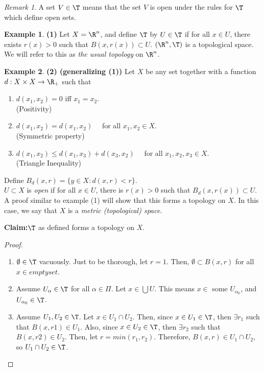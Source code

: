 \documentclass[a5paper]{article}
\theoremstyle{definition}%
\newtheorem*{example*}{Example}
\numberwithin{exercise}{section}
\theoremstyle{remark}%
\newtheorem*{remark*}{Remark}
\begin{document}
\begin{remark*}
A set $V \in \T$ means that the set $V$ is open under the rules for $\T$ which define open sets. 
\end{remark*}

\begin{example*}\textbf{(1)}
Let $X=\R^n$, and define $\T$ by $U \in \T$ if for all $x \in U$, there exists $r(x) >0 $ such that $B(x,r(x))\subset U$. $(\R^n, \T)$ is a topological space. \\
We will refer to this as \emph{the usual topology} on $\R^n$. 
\end{example*}

\begin{example*}\textbf{(2) (generalizing (1))}
Let $X$ be any set together with a function $d:X\times X \to \R_+$ such that 
\begin{enumerate}
\item $d(x_1,x_2)=0$ iff $x_1 = x_2$. \\
(Positivity)
\item $d(x_1,x_2)=d(x_1,x_2)\quad$ for all $x_1,x_2 \in X$.\\
(Symmetric property)
\item $d(x_1,x_2) \leq d(x_1,x_3) + d(x_3,x_2) \quad$ for all $x_1,x_2,x_3 \in X$. \\
(Triangle Inequality)
\end{enumerate}
Define $B_d(x,r)=\{y\in X : d(x,r)<r\}$.\\
$U \subset X$ is \emph{open} if for all $x \in U$, there is $r(x)>0$ such that $B_d(x,r(x))\subset U$. 
A proof similar to example (1) will show that this forms a topology on $X$. In this case, we say that $X$ is a \emph{metric (topological) space}.

\noindent \textbf{Claim:}$\T$ as defined forms a topology on $X$. 
\begin{proof}\mbox{}
\begin{enumerate}
\item $\emptyset \in \T$ vacuously. Just to be thorough, let $r=1$. Then, $\emptyset \subset B(x,r)$ for all $x \in emptyset$. 
\item Assume $U_\alpha \in \T$ for all $\alpha \in \Pi$. Let $x \in \bigcup U$. This means $x \in$ some $U_{\alpha_0}$, and $U_{\alpha_0} \in \T$. 
\item Assume $U_1, U_2 \in \T$. Let $x \in U_1 \cap U_2$. Then, since $x \in U_1 \in \T$, then $\exists r_1$ such that $B(x,r1) \in U_1$. Also, since $x \in U_2 \in \T$, then $\exists r_2$ such that $B(x,r2) \in  U_2$. Then, let $r = min(r_1, r_2)$. Therefore, $B(x,r) \in U_1\cap U_2$, so $U_1\cap U_2 \in \T$.
\end{enumerate}
\end{proof}

\end{example*}
\end{document}
